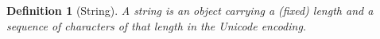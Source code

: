\makeatletter{}\documentclass[10pt,oneside]{book}
\let\oldmarginpar\marginpar
\renewcommand\marginpar[1]{\-\oldmarginpar[\raggedleft\footnotesize #1]%
{\raggedright\footnotesize #1}}
\newcounter{parnum}[section]
\newcommand{\N}{\addtocounter{parnum}{1}\marginpar{\quad\arabic{chapter}.\arabic{section}(\arabic{parnum})}}
\newcommand{\nonterminal}[1]{{\slantsf #1}}
\theoremstyle{note}
\newtheorem{definition}{Definition}[section]
\begin{document}
\begin{definition} [String] A string is an object carrying a
  (fixed) length and a sequence of characters of that length in the Unicode
encoding.
\end{definition}







\end{document}
